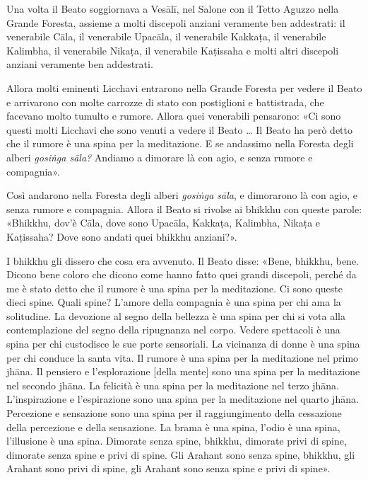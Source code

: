 
Una volta il Beato soggiornava a Vesālī, nel Salone con il Tetto Aguzzo nella
Grande Foresta, assieme a molti discepoli anziani veramente ben addestrati: il
venerabile Cāla, il venerabile Upacāla, il venerabile Kakkaṭa, il venerabile
Kalimbha, il venerabile Nikaṭa, il venerabile Kaṭissaha e molti altri discepoli
anziani veramente ben addestrati.

Allora molti eminenti Licchavi entrarono nella Grande Foresta per vedere il
Beato e arrivarono con molte carrozze di stato con postiglioni e battistrada,
che facevano molto tumulto e rumore. Allora quei venerabili pensarono: «Ci sono
questi molti Licchavi che sono venuti a vedere il Beato … Il Beato ha però detto
che il rumore è una spina per la meditazione. E se andassimo nella Foresta degli
alberi \emph{gosiṅga sāla?} Andiamo a dimorare là con agio, e senza rumore e
compagnia».

Così andarono nella Foresta degli alberi \emph{gosiṅga sāla}, e dimorarono là
con agio, e senza rumore e compagnia. Allora il Beato si rivolse ai bhikkhu con
queste parole: «Bhikkhu, dov’è Cāla, dove sono Upacāla, Kakkaṭa, Kalimbha,
Nikaṭa e Kaṭissaha? Dove sono andati quei bhikkhu anziani?».

I bhikkhu gli dissero che cosa era avvenuto. Il Beato disse: «Bene, bhikkhu,
bene. Dicono bene coloro che dicono come hanno fatto quei grandi discepoli,
perché da me è stato detto che il rumore è una spina per la meditazione. Ci sono
queste dieci spine. Quali spine? L’amore della compagnia è una spina per chi ama
la solitudine. La devozione al segno della bellezza è una spina per chi si vota
alla contemplazione del segno della ripugnanza nel corpo. Vedere spettacoli è
una spina per chi custodisce le sue porte sensoriali. La vicinanza di donne è
una spina per chi conduce la santa vita. Il rumore è una spina per la
meditazione nel primo jhāna. Il pensiero e l’esplorazione [della mente] sono una
spina per la meditazione nel secondo jhāna. La felicità è una spina per la
meditazione nel terzo jhāna. L’inspirazione e l’espirazione sono una spina per
la meditazione nel quarto jhāna. Percezione e sensazione sono una spina per il
raggiungimento della cessazione della percezione e della sensazione. La brama è
una spina, l’odio è una spina, l’illusione è una spina. Dimorate senza spine,
bhikkhu, dimorate privi di spine, dimorate senza spine e privi di spine. Gli
Arahant sono senza spine, bhikkhu, gli Arahant sono privi di spine, gli Arahant
sono senza spine e privi di spine».

